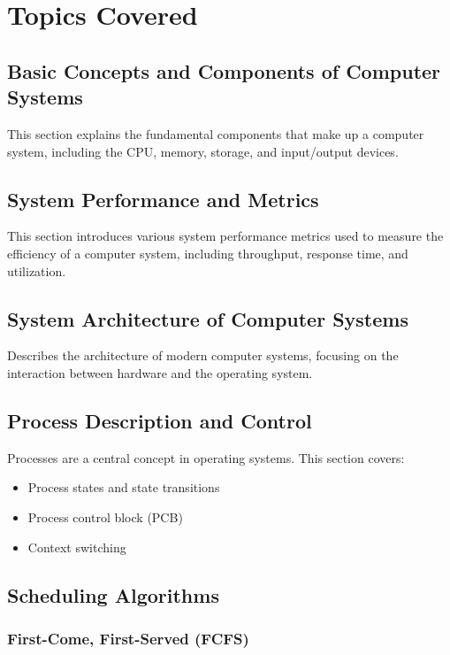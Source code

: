 \documentclass[12pt]{article}
\begin{document}
\section{Topics Covered}

\subsection{Basic Concepts and Components of Computer Systems}
This section explains the fundamental components that make up a computer system, including the CPU, memory, storage, and input/output devices.

\subsection{System Performance and Metrics}
This section introduces various system performance metrics used to measure the efficiency of a computer system, including throughput, response time, and utilization.

\subsection{System Architecture of Computer Systems}
Describes the architecture of modern computer systems, focusing on the interaction between hardware and the operating system.

\subsection{Process Description and Control}
Processes are a central concept in operating systems. This section covers:
\begin{itemize}
    \item Process states and state transitions
    \item Process control block (PCB)
    \item Context switching
\end{itemize}

\subsection{Scheduling Algorithms}
    \subsubsection{First-Come, First-Served (FCFS)} 
\end{document}
